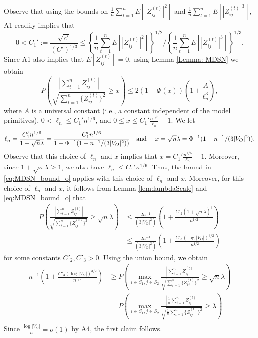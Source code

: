 \documentclass[opre,nonblindrev]{informs3} %
\begin{document}
\begin{APPENDIX}{}
 	Observe that 
 	using the bounds 
 	on
 		$\frac{1}{n}\sum_{t=1}^nE[|Z^{(t)}_{ij}|^2]$ and
 	$\frac{1}{n}\sum_{t=1}^nE[|Z^{(t)}_{ij}|^3]$,
 	A1 readily implies that
 	$$0<C_1':=\frac{\sqrt{c'}}{(C')^{1/3}} \leq \left \{\frac{1}{n} \sum_{t=1}^n E [ |Z^{(t)}_{ij}|^2 ] \right \}^{1/2} \Big / \left \{\frac{1}{n} \sum_{t=1}^n E[|Z^{(t)}_{ij}|^{3}] \right\}^{1/3}.$$
 	Since A1 also implies that $E[Z^{(t)}_{ij}]=0$,
 	using Lemma  \ref{Lemma: MDSN} we obtain
 	\begin{equation} \label{eq:MDSN_bound_o}
 	P\left(  \frac{\left|\sum_{t=1}^n  Z^{(t)}_{ij}  \right|}{\sqrt{ \sum_{t=1}^n \{Z^{(t)}_{ij} \}^2}} \geq x \right) \leq
 	2(1-\Phi(x))\left( 1+\frac{A}{\ell_n^3} \right),
 	\end{equation}
 	where $A$ is 
 	a universal
 	constant (i.e., a constant independent of the model primitives), $0<\ell _n\leq C_1' n^{1/6}$, and $0\leq x \leq  C_1' \frac{n^{1/6}}{\ell_n}-1$.
 	We let
 	$$\ell_n=\frac{C_1' n^{1/6}}{1+ \sqrt{n} \lambda}=\frac{C_1' n^{1/6}}{1+\Phi^{-1}(1-n^{-1}/(3|V_O|^2)) } \mbox{\quad and \quad } x=\sqrt{n}  \lambda=   \Phi^{-1}(1-n^{-1}/(3|V_O|^2)) .$$
 	Observe that this choice of $\ell_n$ and $x$ implies that $x= C_1' \frac{n^{1/6}}{\ell_n}-1$.
 	Moreover, since $1+ \sqrt{n} \lambda \geq 1$, we also have $\ell_n\leq C_1' n^{1/6}$.
 	Thus,  the bound in \eqref{eq:MDSN_bound_o}
 	applies with this choice of $\ell_n$ and $x$.
 	Moreover, for this choice of $\ell_n$ and $x$,
 	it follows  from 
 	Lemma \ref{lem:lambdaScale} %
 	and
 	\eqref{eq:MDSN_bound_o} that
 	\begin{equation} \label{eq:MDSN_bound2_o}
 	\begin{aligned}
 	P\left(
 	\frac{\left|\sum_{t=1}^n  Z^{(t)}_{ij}  \right|}{\sqrt{ \sum_{t=1}^n \{Z^{(t)}_{ij} \}^2}}  \geq 
 	\sqrt{n} \lambda
 	\right)
 	&\leq
 	\frac{2 n^{-1}}{(3|V_O|^2)}
 	\left( 1+\frac{C'_2 (1+\sqrt{n} \lambda)^3}{n^{1/2}}\right) \\
 	&\leq
 	\frac{2 n^{-1}}{(3|V_O|^2)}
 	\left( 1+\frac{C'_3 (\log|V_O|)^{3/2}}{n^{1/2}}\right)
 	\end{aligned}
 	\end{equation}
 	for some constants $C'_2,C'_3>0$.
 	Using the
 	union bound, we obtain
 	\begin{equation} \label{eq:MDSN_bound3_0}
 	\begin{aligned}
 	n^{-1}
 	\left( 1+\frac{C'_3 (\log|V_O|)^{3/2}}{n^{1/2}}\right)
 	&\geq
 	P\left(\max_{ i\in S_1,j \in S_2 }
 	\frac{\left|\sum_{t=1}^n  Z^{(t)}_{ij}  \right|}{\sqrt{ \sum_{t=1}^n \{Z^{(t)}_{ij} \}^2}}
 	\geq  \sqrt{n} \lambda
 	\right) \\
 	&={
 		P\left(\max_{ i\in S_1,j \in S_2 }
 		\frac{\left|\frac{1}{n}\sum_{t=1}^n  Z^{(t)}_{ij}  \right|}{\sqrt{ \frac{1}{n}\sum_{t=1}^n \{Z^{(t)}_{ij} \}^2}}
 		\geq \lambda 
 		\right)
 	}\\ 
 	\end{aligned}
 	\end{equation}
 	Since
 	$\frac{\log |V_O|}{n}=o(1)$ by A4, the first claim follows.
 	

\end{APPENDIX}
\end{document}
